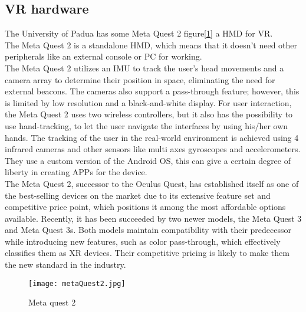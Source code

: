 \subsection{VR hardware}
\noindent
The University of Padua has some Meta Quest 2 figure[\ref{fig:metaQuest2}] a \ac{HMD} for \ac{VR}.\\ 
The Meta Quest 2 is a standalone \ac{HMD}, which means that it doesn't need other peripherals like an external console or \ac{PC} for working.\\
The Meta Quest 2 utilizes an \ac{IMU} to track the user's head movements and a camera array to determine their position in space, eliminating the need for external beacons.
The cameras also support a pass-through feature; however, this is limited by low resolution and a black-and-white display.
For user interaction, the Meta Quest 2 uses two wireless controllers, but it also has the possibility to use hand-tracking, to let the user navigate the interfaces by using his/her own hands.
The tracking of the user in the real-world environment is achieved using 4 infrared cameras and other sensors like multi axes gyroscopes and accelerometers.\\
They use a custom version of the Android \ac{OS}, this can give a certain degree of liberty in creating APPs for the device.\\
The Meta Quest 2, successor to the Oculus Quest, has established itself as one of the best-selling devices on the market due to its extensive feature set and competitive price point, which positions it among the most affordable options available.
Recently, it has been succeeded by two newer models, the Meta Quest 3 and Meta Quest 3s.
Both models maintain compatibility with their predecessor while introducing new features, such as color pass-through, which effectively classifies them as \ac{XR} devices.
Their competitive pricing is likely to make them the new standard in the industry.


\begin{figure}[ht]
  \centering
  \texttt{[image: metaQuest2.jpg]}
  \caption{Meta quest 2}
  \label{fig:metaQuest2}
\end{figure}


